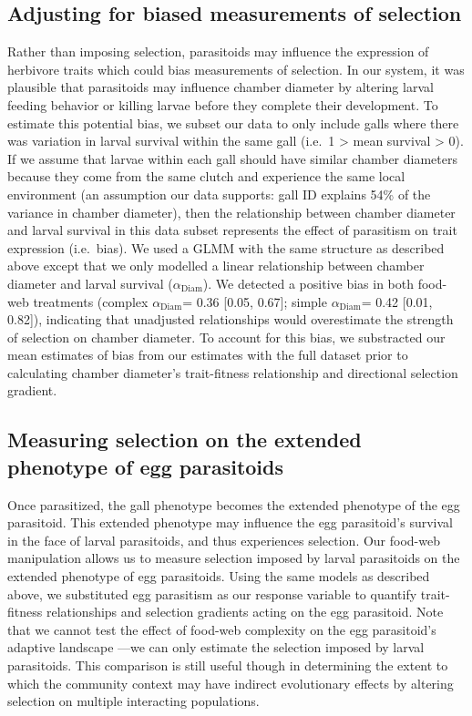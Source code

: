 \documentclass[11pt,]{article}
\begin{document}
\subsection{Adjusting for biased measurements of
selection}\label{adjusting-for-biased-measurements-of-selection}

Rather than imposing selection, parasitoids may influence the expression
of herbivore traits which could bias measurements of selection. In our
system, it was plausible that parasitoids may influence chamber diameter
by altering larval feeding behavior or killing larvae before they
complete their development. To estimate this potential bias, we subset
our data to only include galls where there was variation in larval
survival within the same gall (i.e.~1 \textgreater{} mean survival
\textgreater{} 0). If we assume that larvae within each gall should have
similar chamber diameters because they come from the same clutch and
experience the same local environment (an assumption our data supports:
gall ID explains 54\% of the variance in chamber diameter), then the
relationship between chamber diameter and larval survival in this data
subset represents the effect of parasitism on trait expression
(i.e.~bias). We used a GLMM with the same structure as described above
except that we only modelled a linear relationship between chamber
diameter and larval survival (\(\alpha_{\text{Diam}}\)). We detected a
positive bias in both food-web treatments (complex
\(\alpha_{\text{Diam}}\)= 0.36 {[}0.05, 0.67{]}; simple
\(\alpha_{\text{Diam}}\)= 0.42 {[}0.01, 0.82{]}), indicating that
unadjusted relationships would overestimate the strength of selection on
chamber diameter. To account for this bias, we substracted our mean
estimates of bias from our estimates with the full dataset prior to
calculating chamber diameter's trait-fitness relationship and
directional selection gradient.

\subsection{Measuring selection on the extended phenotype of egg
parasitoids}\label{measuring-selection-on-the-extended-phenotype-of-egg-parasitoids}

Once parasitized, the gall phenotype becomes the extended phenotype of
the egg parasitoid. This extended phenotype may influence the egg
parasitoid's survival in the face of larval parasitoids, and thus
experiences selection. Our food-web manipulation allows us to measure
selection imposed by larval parasitoids on the extended phenotype of egg
parasitoids. Using the same models as described above, we substituted
egg parasitism as our response variable to quantify trait-fitness
relationships and selection gradients acting on the egg parasitoid. Note
that we cannot test the effect of food-web complexity on the egg
parasitoid's adaptive landscape ---we can only estimate the selection
imposed by larval parasitoids. This comparison is still useful though in
determining the extent to which the community context may have indirect
evolutionary effects by altering selection on multiple interacting
populations.
\end{document}

